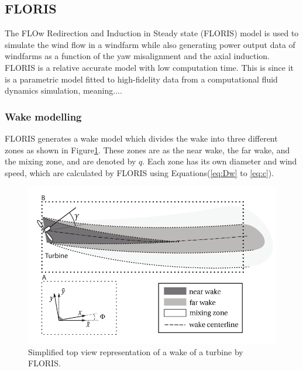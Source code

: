 
\subsection{FLORIS} The FLOw Redirection and Induction in Steady state (FLORIS) model is used to simulate the wind flow in a windfarm while also generating power output data of windfarms as a function of the yaw misalignment and the axial induction\cite{Gebraad2016}. FLORIS is a relative accurate model\cite{Dijk2016} with low computation time. This is since it is a parametric model fitted to high-fidelity data from a computational fluid dynamics simulation, meaning.... 

\subsubsection{Wake modelling}
\label{wakemodel}
FLORIS generates a wake model which divides the wake into three different zones as shown in Figure\ref{fig:wake}. These zones are as the near wake, the far wake, and the mixing zone, and are denoted by $q$. Each zone has its own diameter and wind speed, which are calculated by FLORIS using Equations(\ref{eq:Dw} to \ref{eq:c}). 


\begin{figure}
  	\includegraphics[width=\linewidth]{./Figures/WakeFLORIS.png}
  	\caption{Simplified top view representation of a wake of a turbine by FLORIS.\cite{Gebraad2016}   }
	\label{fig:wake}
\end{figure}


